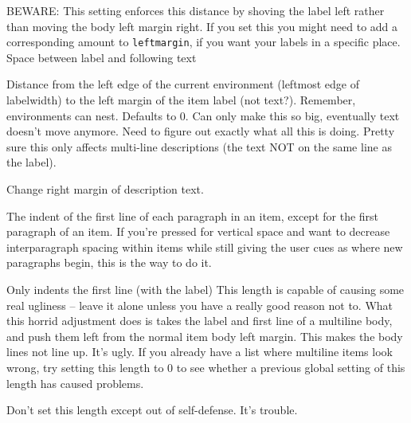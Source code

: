 \documentclass{article}
\begin{document}
\begin{description}[labelindent=2cm, leftmargin=\labelindent,
        ]
        BEWARE\@: This setting enforces this distance by shoving the
        label left rather than moving the body left margin right. If
        you set this you might need to add a corresponding amount to
        \texttt{leftmargin}, if you want your labels in a specific place.
        Space between label and following text
    \item [leftmargin] Distance from the left edge of the current
        environment (leftmost edge of labelwidth) to the left margin of the
        item label (not text?). Remember, environments can nest. Defaults to 0.
        Can only make this so big, eventually text doesn't move anymore.
        Need to figure out exactly what all this is doing.
        Pretty sure this only affects multi-line descriptions
        (the text NOT on the same line as the label).
    \item [rightmargin] Change right margin of description text.
    \item [listparindent] The indent of the first line of each
        paragraph in an item, except for the first paragraph of an
        item. If you're pressed for vertical space and want to
        decrease interparagraph spacing within items while still
        giving the user cues as where new paragraphs begin, this is
        the way to do it.
    \item [itemindent] Only indents the first line (with the label)
        This length is capable of causing some real ugliness -- leave
        it alone unless you have a really good reason not to. What
        this horrid adjustment does is takes the label and first line
        of a multiline body, and push them left from the normal item
        body left margin. This makes the body lines not line up. It's
        ugly. If you already have a list where multiline items look
        wrong, try setting this length to 0 to see whether a previous
        global setting of this length has caused problems.

        Don't set this length except out of self-defense. It's trouble.
\end{description}
\end{document}
